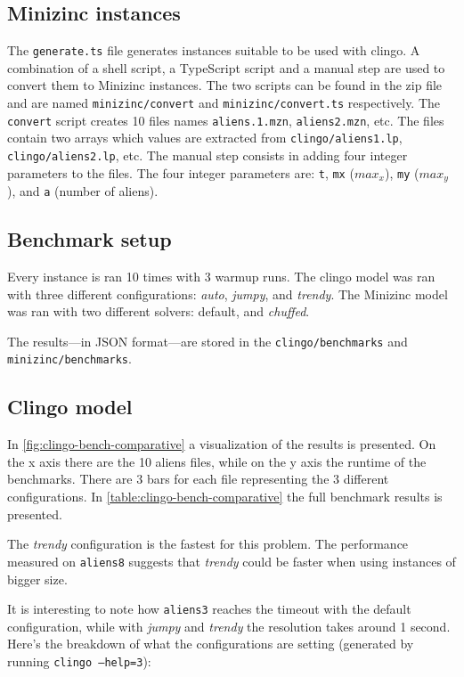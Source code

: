 \documentclass[11pt]{article}
\begin{document}
\subsection{Minizinc instances}

The \texttt{generate.ts} file generates instances suitable to be used with clingo.
A combination of a shell script, a TypeScript script and a manual step are used to convert them to Minizinc instances.
The two scripts can be found in the zip file and are named \texttt{minizinc/convert} and \texttt{minizinc/convert.ts} respectively.
The \texttt{convert} script creates 10 files names \texttt{aliens.1.mzn}, \texttt{aliens2.mzn}, etc.
The files contain two arrays which values are extracted from \texttt{clingo/aliens1.lp}, \texttt{clingo/aliens2.lp}, etc.
The manual step consists in adding four integer parameters to the files.
The four integer parameters are: \texttt{t}, \texttt{mx} ($max_x$), \texttt{my} ($max_y$), and \texttt{a} (number of aliens).

\subsection{Benchmark setup}

Every instance is ran 10 times with 3 warmup runs.
The clingo model was ran with three different configurations: \textit{auto}, \textit{jumpy}, and \textit{trendy}.
The Minizinc model was ran with two different solvers: default, and \textit{chuffed}.

The results---in JSON format---are stored in the \texttt{clingo/benchmarks} and \texttt{minizinc/benchmarks}.

\subsection{Clingo model}

In \autoref{fig:clingo-bench-comparative} a visualization of the results is presented.
On the x axis there are the 10 aliens files, while on the y axis the runtime of the benchmarks.
There are 3 bars for each file representing the 3 different configurations.
In \autoref{table:clingo-bench-comparative} the full benchmark results is presented.

The \textit{trendy} configuration is the fastest for this problem.
The performance measured on \texttt{aliens8} suggests that \textit{trendy} could be faster when using instances of bigger size.

It is interesting to note how \texttt{aliens3} reaches the timeout with the default configuration, while with \textit{jumpy} and \textit{trendy} the resolution takes around 1 second.
Here's the breakdown of what the configurations are setting (generated by running \texttt{clingo --help=3}):
\end{document}
